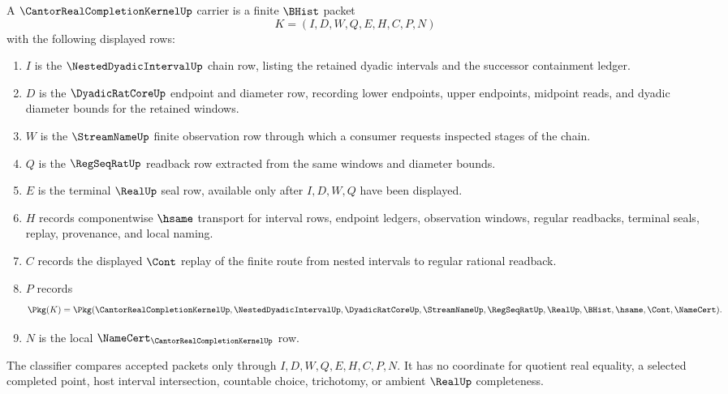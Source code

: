 \begin{definition}
\label{def:cantor-real-completion-kernel-carrier}
A $\CantorRealCompletionKernelUp$ carrier is a finite $\BHist$ packet
$$
K=(I,D,W,Q,E,H,C,P,N)
$$
with the following displayed rows:
\begin{enumerate}
\item $I$ is the $\NestedDyadicIntervalUp$ chain row, listing the retained dyadic intervals and the successor containment ledger.
\item $D$ is the $\DyadicRatCoreUp$ endpoint and diameter row, recording lower endpoints, upper endpoints, midpoint reads, and dyadic diameter bounds for the retained windows.
\item $W$ is the $\StreamNameUp$ finite observation row through which a consumer requests inspected stages of the chain.
\item $Q$ is the $\RegSeqRatUp$ readback row extracted from the same windows and diameter bounds.
\item $E$ is the terminal $\RealUp$ seal row, available only after $I,D,W,Q$ have been displayed.
\item $H$ records componentwise $\hsame$ transport for interval rows, endpoint ledgers, observation windows, regular readbacks, terminal seals, replay, provenance, and local naming.
\item $C$ records the displayed $\Cont$ replay of the finite route from nested intervals to regular rational readback.
\item $P$ records
$$
\Pkg(K)=\Pkg(\CantorRealCompletionKernelUp,\NestedDyadicIntervalUp,\DyadicRatCoreUp,\StreamNameUp,\RegSeqRatUp,\RealUp,\BHist,\hsame,\Cont,\NameCert).
$$
\item $N$ is the local $\NameCert_{\CantorRealCompletionKernelUp}$ row.
\end{enumerate}
The classifier compares accepted packets only through $I,D,W,Q,E,H,C,P,N$. It has no coordinate for quotient real equality, a selected completed point, host interval intersection, countable choice, trichotomy, or ambient $\RealUp$ completeness.
\end{definition}

